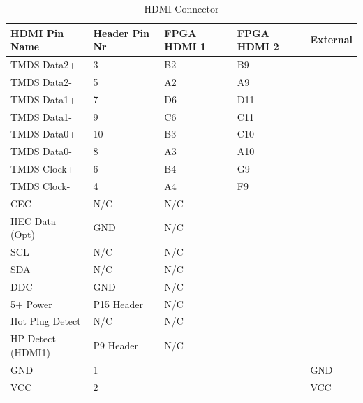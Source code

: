 \begin{table}[]
    \centering
    \begin{tabular}{lllll}
        HDMI Pin Name            & Header Pin Nr & FPGA HDMI 1 & FPGA HDMI 2 & External \\
        \hline
        TMDS Data2+              & 3             & B2              & B9              &          \\
        TMDS Data2-              & 5             & A2              & A9              &          \\
        TMDS Data1+              & 7             & D6              & D11             &          \\
        TMDS Data1-              & 9             & C6              & C11             &          \\
        TMDS Data0+              & 10            & B3              & C10             &          \\
        TMDS Data0-              & 8             & A3              & A10             &          \\
        TMDS Clock+              & 6             & B4              & G9              &          \\
        TMDS Clock-              & 4             & A4              & F9              &          \\
        CEC                      & N/C           & N/C             &                 &          \\
        HEC Data (Opt)           & GND           & N/C             &                 &          \\
        SCL                      & N/C           & N/C             &                 &          \\
        SDA                      & N/C           & N/C             &                 &          \\
        DDC                      & GND           & N/C             &                 &          \\
        5+ Power                 & P15 Header    & N/C             &                 &          \\
        Hot Plug Detect          & N/C           & N/C             &                 &          \\
        HP Detect (HDMI1) & P9 Header     & N/C             &                 &          \\
        GND & 1             &                 &                 & GND      \\
        VCC & 2             &                 &                 & VCC      \\
    \end{tabular}
    \caption{HDMI Connector}
    \label{HDMI_Connector}
\end{table}

